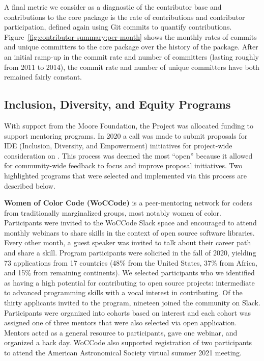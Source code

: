 \documentclass[modern]{aastex631}
\newcommand{\secauthor}[1]{{\color{blue}Author:~\textit{#1}}}
\begin{document}
A final metric we consider as a diagnostic of the contributor base and
contributions to the \astropypkg core package is the rate of contributions and
contributor participation, defined again using Git commits to quantify
contributions.
Figure~\ref{fig:contributor-summary:per-month} shows the monthly rates of
commits and unique committers to the \astropypkg core package over the history
of the package.
After an initial ramp-up in the commit rate and number of committers (lasting
roughly from 2011 to 2014), the commit rate and number of unique committers have
both remained fairly constant.


\subsection{Inclusion, Diversity, and Equity Programs} \label{sec:project-ide}


With support from the Moore Foundation, the \astropy Project was
allocated funding to support mentoring programs. In 2020 a call was
made to submit proposals for IDE (Inclusion, Diversity, and
Empowerment) initiatives for project-wide consideration on
\github. This process was deemed the most ``open'' because it allowed
for community-wide feedback to focus and improve proposal
initiatives. Two highlighted programs that were selected and implemented via
this process are described below.


\textbf{Women of Color Code (WoCCode)} is a peer-mentoring network for
coders from traditionally marginalized groups, most notably women of
color. Participants were invited to the WoCCode Slack space and
encouraged to attend monthly webinars to share skills in the context
of open source software libraries. Every other month, a guest speaker
was invited to talk about their career path and share a skill. Program
participants were solicited in the fall of 2020, yielding 73
applications from 17 countries (48\% from the United States, 37\% from
Africa, and 15\% from remaining continents). We selected participants
who we identified as having a high potential for contributing to open
source projects: intermediate to advanced programming skills with a
vocal interest in contributing. Of the thirty applicants invited to
the program, nineteen joined the community on Slack. Participants were
organized into cohorts based on interest and each cohort was assigned
one of three mentors that were also selected via open
application. Mentors acted as a general resource to participants, gave
one webinar, and organized a hack day. WoCCode also supported
registration of two participants to attend the American Astronomical
Society virtual summer 2021 meeting.
\end{document}

